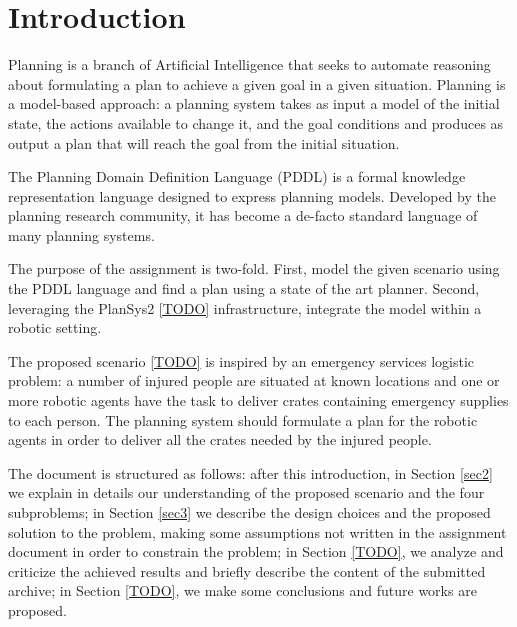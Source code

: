 \section{Introduction}
Planning is a branch of Artificial Intelligence that seeks to automate reasoning about
formulating a plan to achieve a given goal in a given situation. 
Planning is a model-based approach: a planning system takes as input a model of the initial state, 
the actions available to change it, and the goal conditions and produces as output a plan 
that will reach the goal from the initial situation.

The Planning Domain Definition Language (PDDL) is a formal knowledge representation language 
designed to express planning models. Developed by the planning research community, 
it has become a de-facto standard language of many planning systems.

The purpose of the assignment is two-fold. First, model the given scenario using the PDDL language 
and find a plan using a state of the art planner. Second, leveraging the PlanSys2 \ref{TODO} 
infrastructure, integrate the model within a robotic setting.

The proposed scenario \ref{TODO} is inspired by an emergency services logistic problem:
a number of injured people are situated at known locations and one or more robotic agents
have the task to deliver crates containing emergency supplies to each person. 
The planning system should formulate a plan for the robotic agents in order to deliver all
the crates needed by the injured people.

The document is structured as follows: after this introduction, in Section \ref{sec2} 
we explain in details our understanding of the proposed scenario and the four subproblems; 
in Section \ref{sec3} we describe the design choices and the proposed solution to the problem,
making some assumptions not written in the assignment document in order to constrain the problem;
in Section \ref{TODO}, we analyze and criticize the achieved results and briefly describe the
content of the submitted archive; in Section \ref{TODO}, we make some conclusions and future 
works are proposed.


